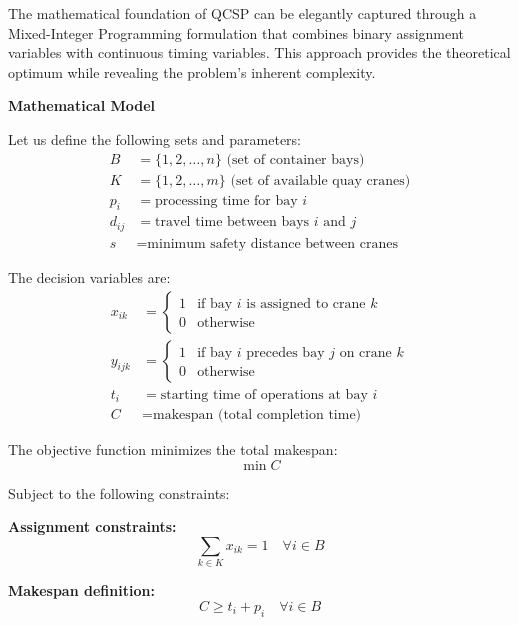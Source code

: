 \documentclass{article}
\begin{document}
The mathematical foundation of QCSP can be elegantly captured through a Mixed-Integer Programming formulation that combines binary assignment variables with continuous timing variables. This approach provides the theoretical optimum while revealing the problem's inherent complexity.

\textbf{Mathematical Model}

Let us define the following sets and parameters:
\begin{align}
B &= \{1, 2, \ldots, n\} \text{ (set of container bays)} \\
K &= \{1, 2, \ldots, m\} \text{ (set of available quay cranes)} \\
p_i &= \text{processing time for bay } i \\
d_{ij} &= \text{travel time between bays } i \text{ and } j \\
s &= \text{minimum safety distance between cranes}
\end{align}

The decision variables are:
\begin{align}
x_{ik} &= \begin{cases} 
1 & \text{if bay } i \text{ is assigned to crane } k \\
0 & \text{otherwise}
\end{cases} \\
y_{ijk} &= \begin{cases}
1 & \text{if bay } i \text{ precedes bay } j \text{ on crane } k \\
0 & \text{otherwise}
\end{cases} \\
t_i &= \text{starting time of operations at bay } i \\
C &= \text{makespan (total completion time)}
\end{align}

The objective function minimizes the total makespan:
\begin{equation}
\min C
\end{equation}

Subject to the following constraints:

\textbf{Assignment constraints:}
\begin{equation}
\sum_{k \in K} x_{ik} = 1 \quad \forall i \in B
\end{equation}

\textbf{Makespan definition:}
\begin{equation}
C \geq t_i + p_i \quad \forall i \in B
\end{equation}
\end{document}
